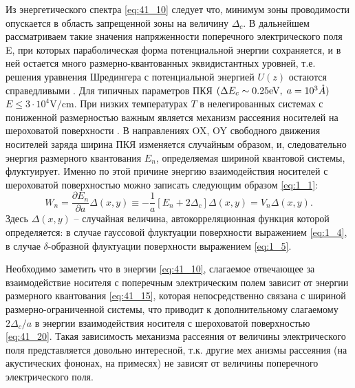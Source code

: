 Из энергетического спектра \eqref{eq:41_10} следует что, минимум зоны проводимости опускается в область запрещенной зоны на величину $\Delta _{c} $. В дальнейшем рассматриваем такие значения напряженности поперечного электрического поля E, при которых параболическая форма потенциальной энергии сохраняется, и в ней остается много размерно-квантованных эквидистантных уровней, т.е. решения уравнения Шредингера с потенциальной энергией $U(z)$ остаются справедливыми \cite{Kanarovskii1995}. Для типичных параметров ПКЯ $(\Delta E_{c} \sim 0.25\mathrm{eV}, \; a=10^3 \AA)$ $E\le 3\cdot 10^4 \mathrm{V/cm}$. При низких температурах $T$ в нелегированных системах с пониженной размерностью важным является механизм рассеяния носителей на шероховатой поверхности \cite{Sakaki1987,Vurgaftman1999}. В направлениях OX, OY свободного движения носителей заряда ширина ПКЯ изменяется случайным образом, и, следовательно энергия размерного квантования $E_n$, определяемая шириной квантовой системы, флуктуирует. Именно по этой причине энергию взаимодействия носителей с шероховатой поверхностью можно записать следующим образом \eqref{eq:1_1}:
\begin{equation} \label{eq:41_20}
W_{n} =\frac{\partial E_n }{\partial a} \Delta(x,y) \equiv -\frac{1}{a} \left[ E_n +2\Delta_c \right] \Delta (x,y)=V_n \Delta (x,y).
\end{equation}
Здесь $\Delta (x,y)$ -- случайная величина, автокорреляционная функция которой определяется: в случае гауссовой флуктуации поверхности выражением \eqref{eq:1_4}, в случае $\delta$-образной флуктуации поверхности выражением \eqref{eq:1_5}.

Необходимо заметить что в энергии \eqref{eq:41_10}, слагаемое отвечающее за взаимодействие носителя с поперечным электрическим полем зависит от энергии размерного квантования \eqref{eq:41_15}, которая непосредственно связана с шириной размерно-ограниченной системы, что приводит к дополнительному слагаемому $2\Delta_c / a$ в энергии взаимодействия носителя с шероховатой поверхностью \eqref{eq:41_20}. Такая зависимость механизма рассеяния от величины электрического поля представляется довольно интересной, т.к. другие мех анизмы рассеяния (на акустических фононах, на примесях) не зависят от величины поперечного электрического поля.

